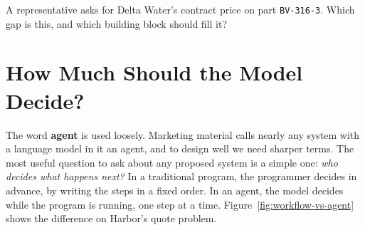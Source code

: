 \begin{quickcheck}
A representative asks for Delta Water's contract price on part \texttt{BV-316-3}. Which gap is this, and which building block should fill it?
\end{quickcheck}

\section{How Much Should the Model Decide?}
\label{sec:autonomy}

The word \textbf{agent} is used loosely. Marketing material calls nearly any system with a language model in it an agent, and to design well we need sharper terms. The most useful question to ask about any proposed system is a simple one: \emph{who decides what happens next?} In a traditional program, the programmer decides in advance, by writing the steps in a fixed order. In an agent, the model decides while the program is running, one step at a time. Figure~\ref{fig:workflow-vs-agent} shows the difference on Harbor's quote problem.

